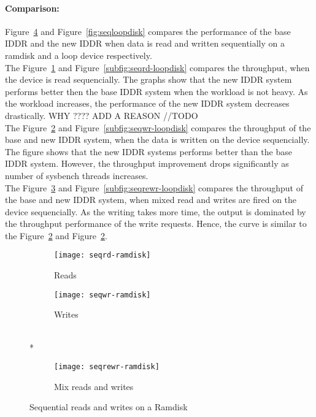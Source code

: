 \paragraph{Comparison:}
Figure~\ref{fig:seqramdisk} and Figure~\ref{fig:seqloopdisk} compares the performance of the base IDDR and the new IDDR when data is read and written sequentially on a ramdisk and a loop device respectively.
\\[3mm]
The Figure~\ref{subfig:seqrd-ramdisk} and Figure~\ref{subfig:seqrd-loopdisk} compares the throughput, when the device is read sequencially. The graphs show that the new IDDR system performs better then the base IDDR system when the workload is not heavy. As the workload increases, the performance of the new IDDR system decreases drastically. WHY ???? ADD A REASON //TODO
\\[3mm]
The Figure~\ref{subfig:seqwr-ramdisk} and Figure~\ref{subfig:seqwr-loopdisk} compares the throughput of the base and new IDDR system, when the data is written on the device sequencially. The figure shows that the new IDDR systems performs better than the base IDDR system. However, the throughput improvement drops significantly as number of sysbench threads increases.
\\[3mm]
The Figure~\ref{subfig:seqrewr-ramdisk} and Figure~\ref{subfig:seqrewr-loopdisk} compares the throughput of the base and new IDDR system, when mixed read and writes are fired on the device sequencially. As the writing takes more time, the output is dominated by the throughput performance of the write requests. Hence, the curve is similar to the Figure~\ref{subfig:seqwr-ramdisk} and Figure~\ref{subfig:seqwr-ramdisk}. 

\begin{figure}[!ht]
  \begin{subfigure}[b]{0.2\textwidth}
  \texttt{[image: seqrd-ramdisk]}
  \caption{Reads}
  \label{subfig:seqrd-ramdisk}
  \end{subfigure}
  \hspace{50mm}
  \begin{subfigure}[b]{0.2\textwidth}
  \texttt{[image: seqwr-ramdisk]}
  \caption{Writes}
  \label{subfig:seqwr-ramdisk}
  \end{subfigure}\\*
  \hspace{150mm}
  \begin{subfigure}[b]{0.3\textwidth}
  \texttt{[image: seqrewr-ramdisk]}
  \caption{Mix reads and writes}
  \label{subfig:seqrewr-ramdisk}
  \end{subfigure}
  \caption{Sequential reads and writes on a Ramdisk}\label{fig:seqramdisk}
\end{figure}

